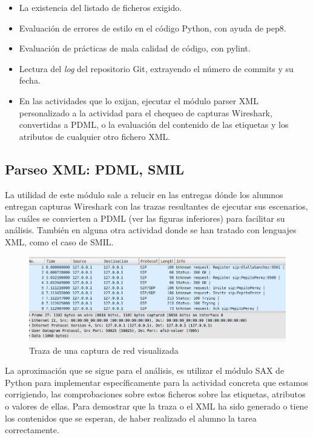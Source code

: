 \begin{itemize}
\item La existencia del listado de ficheros exigido.

\item Evaluación de errores de estilo en el código Python, con ayuda de pep8.

\item Evaluación de prácticas de mala calidad de código, con pylint.

\item Lectura del \textit{log} del repositorio Git, extrayendo el número de commits y su fecha.

\item En las actividades que lo exijan, ejecutar el módulo parser XML personalizado a la actividad para el chequeo de capturas Wireshark, convertidas a PDML, o la evaluación del contenido de las etiquetas y los atributos de cualquier otro fichero XML.
\end{itemize}


\subsection{Parseo XML: PDML, SMIL}
\label{sec:parseo}

La utilidad de este módulo sale a relucir en las entregas dónde los alumnos entregan capturas Wireshark con las trazas resultantes de ejecutar sus escenarios, las cuáles se convierten a PDML (ver las figuras inferiores) para facilitar su análisis. También en alguna otra actividad donde se han tratado con lenguajes XML, como el caso de SMIL.\\


\begin{figure}[H]
   \centering
   \includegraphics[width=16cm]{img/Selection_014_traza_wireshark}
   \caption{Traza de una captura de red visualizada}
   \label{figura:traza_wireshark}
\end{figure}


La aproximación que se sigue para el análisis, es utilizar el módulo SAX de Python para implementar específicamente para la actividad concreta que estamos corrigiendo, las comprobaciones sobre estos ficheros sobre las etiquetas, atributos o valores de ellas. Para demostrar que la traza o el XML ha sido generado o tiene los contenidos que se esperan, de haber realizado el alumno la tarea correctamente.\\


